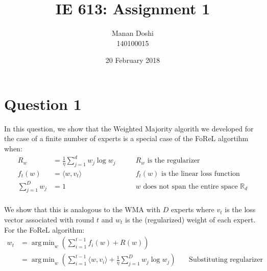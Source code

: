 \documentclass{article}
\title{IE 613: Assignment 1}
\author{Manan Doshi \\ 140100015}
\date{20 February 2018}
\DeclareMathOperator*{\argmin}{arg\,min}
\begin{document}
\graphicspath{{./plots}}
\maketitle

\section*{Question 1}

In this question, we show that the Weighted Majority algorith we developed for the case of a finite number of experts is a special case of the FoReL algortihm when:
\begin{align*}
    R_w  &= \frac{1}{\eta}\sum_{j=1}^{d} w_j \log w_j \qquad &\text{$R_w$ is the regularizer}\\
    f_t(w) &= \langle w,v_t \rangle \qquad &\text{$f_t(w)$ is the linear loss function}\\
    \sum_{j=1}^{D} w_j &= 1 \qquad &\text{$w$ does not span the entire space $\mathbb{R}_d$}\\
\end{align*}

We show that this is analogous to the WMA with $D$ experts where $v_t$ is the loss vector associated with round $t$ and $w_t$ is the (regularized) weight of each expert.\\
For the FoReL algorithm:
\begin{align*}
    w_t &= \argmin_{w} \left( \sum_{i=1}^{t-1} f_i(w) + R(w) \right) &\qquad\\
    &= \argmin_{w} \left( \sum_{i=1}^{t-1} \langle w,v_i \rangle + \frac{1}{\eta} \sum_{j=1}^{D} w_j \log w_j \right) &\qquad \text{Substituting regularizer and loss terms}\\
\end{align*}
\end{document}

